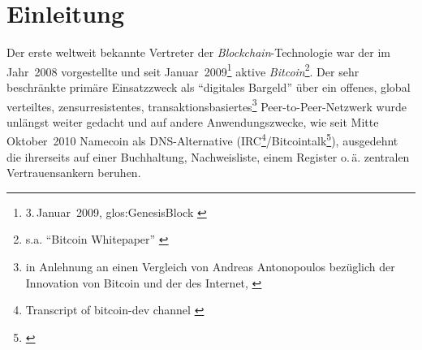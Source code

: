 






\chapter{Einleitung}\label{einleitung}


Der erste weltweit bekannte Vertreter der \emph{Blockchain}-Technologie war der im Jahr~2008 vorgestellte und seit Januar~2009\footnote{3.\,Januar~2009, \gls{glos:GenesisBlock} \autocite{w:bitcoin-wiki}} aktive \emph{Bitcoin}\footnote{s.a. \enquote{Bitcoin Whitepaper} \autocite{p:bitcoin}}.
Der sehr beschränkte primäre Einsatzzweck als \enquote{digitales Bargeld} über ein offenes, global verteiltes, zensurresistentes, transaktionsbasiertes\footnote{in Anlehnung an einen Vergleich von Andreas Antonopoulos bezüglich der Innovation von Bitcoin und der des Internet, \autocite{o:open-blockchain}} Peer-to-Peer-Netzwerk  wurde unlängst weiter gedacht und auf andere Anwendungszwecke, wie \zB{} seit Mitte Oktober~2010 Namecoin als DNS-Alternative (IRC\footnote{Transcript of bitcoin-dev channel \autocite{w:irc-ts-bitcoindev}}/Bitcointalk\footnote{\cite{w:bitcointalk-bitdns}}), ausgedehnt die ihrerseits auf einer Buchhaltung, Nachweisliste, einem Register o.\,ä. zentralen Vertrauensankern beruhen.

